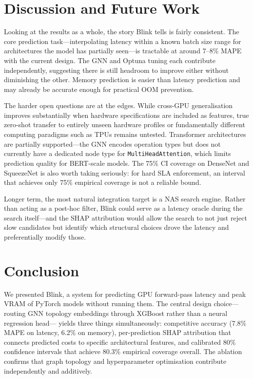 \documentclass[conference]{IEEEtran}
\begin{document}
\section{Discussion and Future Work}

Looking at the results as a whole, the story Blink tells is fairly consistent.
The core prediction task---interpolating latency within a known batch size range
for architectures the model has partially seen---is tractable at around 7--8\%
MAPE with the current design. The GNN and Optuna tuning each contribute
independently, suggesting there is still headroom to improve either without
diminishing the other. Memory prediction is easier than latency prediction and
may already be accurate enough for practical OOM prevention.

The harder open questions are at the edges. While cross-GPU generalisation
improves substantially when hardware specifications are included as features,
true zero-shot transfer to entirely unseen hardware profiles or fundamentally
different computing paradigms such as TPUs remains untested. Transformer
architectures are partially supported---the GNN encodes operation types but does
not currently have a dedicated node type for \texttt{MultiHeadAttention}, which
limits prediction quality for BERT-scale models. The 75\% CI coverage on DenseNet
and SqueezeNet is also worth taking seriously: for hard SLA enforcement, an
interval that achieves only 75\% empirical coverage is not a reliable bound.

Longer term, the most natural integration target is a NAS search engine. Rather
than acting as a post-hoc filter, Blink could serve as a latency oracle during
the search itself---and the SHAP attribution would allow the search to not just
reject slow candidates but identify which structural choices drove the latency
and preferentially modify those.

\section{Conclusion}

We presented Blink, a system for predicting GPU forward-pass latency and peak
VRAM of PyTorch models without running them. The central design choice---routing
GNN topology embeddings through XGBoost rather than a neural regression head---
yields three things simultaneously: competitive accuracy (7.8\% MAPE on latency,
6.2\% on memory), per-prediction SHAP attribution that connects predicted costs
to specific architectural features, and calibrated 80\% confidence intervals
that achieve 80.3\% empirical coverage overall. The ablation confirms that graph
topology and hyperparameter optimisation contribute independently and additively.
\end{document}
